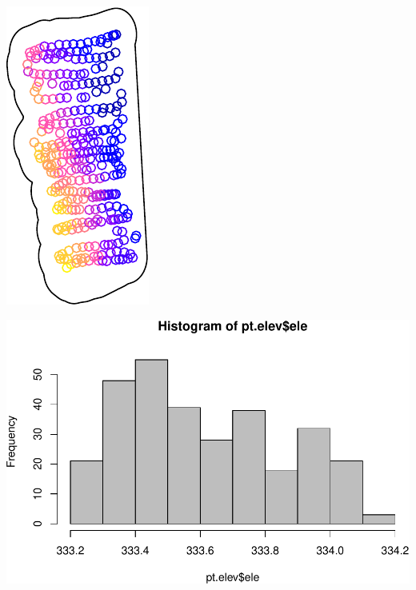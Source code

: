 \documentclass[
]{book}
\newenvironment{Shaded}{\begin{snugshade}}{\end{snugshade}}
\newcommand{\AttributeTok}[1]{\textcolor[rgb]{0.13,0.29,0.53}{#1}}
\newcommand{\FunctionTok}[1]{\textcolor[rgb]{0.13,0.29,0.53}{\textbf{#1}}}
\newcommand{\NormalTok}[1]{#1}
\newcommand{\SpecialCharTok}[1]{\textcolor[rgb]{0.81,0.36,0.00}{\textbf{#1}}}
\newcommand{\StringTok}[1]{\textcolor[rgb]{0.31,0.60,0.02}{#1}}
\begin{document}
\includegraphics{_main_files/figure-latex/unnamed-chunk-15-1.pdf}

\begin{Shaded}
\end{Shaded}

\includegraphics{_main_files/figure-latex/unnamed-chunk-15-2.pdf}

\begin{Shaded}
\end{Shaded}
\end{document}
